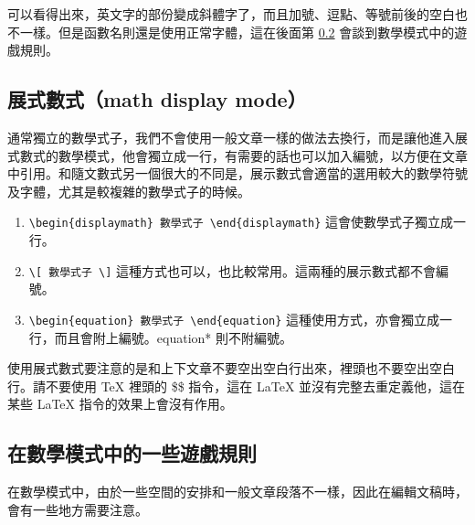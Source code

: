 可以看得出來，英文字的部份變成斜體字了，而且加號、逗點、等號前後的空白也不一樣。但是函數名則還是使用正常字體，這在後面第 \ref{subsec:mathrules} 會談到數學模式中的遊戲規則。

\subsection{展式數式（math display mode）}

通常獨立的數學式子，我們不會使用一般文章一樣的做法去換行，而是讓他進入展式數式的數學模式，他會獨立成一行，有需要的話也可以加入編號，以方便在文章中引用。和隨文數式另一個很大的不同是，展示數式會適當的選用較大的數學符號及字體，尤其是較複雜的數學式子的時候。

\begin{enumerate}

  \item \verb|\begin{displaymath} 數學式子 \end{displaymath}| \newline
        這會使數學式子獨立成一行。

  \item \verb|\[ 數學式子 \]| \newline
        這種方式也可以，也比較常用。這兩種的展示數式都不會編號。

  \item \verb|\begin{equation} 數學式子 \end{equation}| \newline
        這種使用方式，亦會獨立成一行，而且會附上編號。{\ttfamily equation*} 則不附編號。

\end{enumerate}

使用展式數式要注意的是和上下文章不要空出空白行出來，裡頭也不要空出空白行。請不要使用 \TeX{} 裡頭的 {\ttfamily \$\$} 指令，這在 \LaTeX{} 並沒有完整去重定義他，這在某些 \LaTeX{} 指令的效果上會沒有作用。

\subsection{在數學模式中的一些遊戲規則}
\label{subsec:mathrules}

在數學模式中，由於一些空間的安排和一般文章段落不一樣，因此在編輯文稿時，會有一些地方需要注意。

